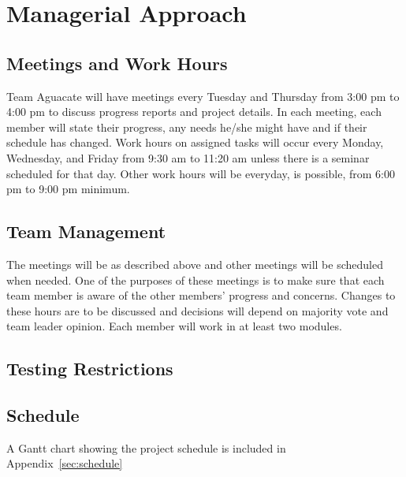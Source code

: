 \section{Managerial Approach}

\subsection{Meetings and Work Hours}
Team Aguacate will have meetings every Tuesday and Thursday from 3:00 pm to 4:00 pm to discuss progress reports and project details.  In each meeting, each member will state their progress, any needs he/she might have and if their schedule has changed.  Work hours on assigned tasks will occur every Monday, Wednesday, and Friday from 9:30 am to 11:20 am unless there is a seminar scheduled for that day.  Other work hours will be everyday, is possible, from 6:00 pm to 9:00 pm minimum.

\subsection{Team Management}
The meetings will be as described above and other meetings will be scheduled when needed.  One of the purposes of these meetings is to make sure that each team member is aware of the other members' progress and concerns.  Changes to these hours are to be discussed and decisions will depend on majority vote and team leader opinion.  Each member will work in at least two modules.

\subsection{Testing Restrictions}
\subsection{Schedule}
A Gantt chart showing the project schedule is included in Appendix~\ref{sec:schedule} 